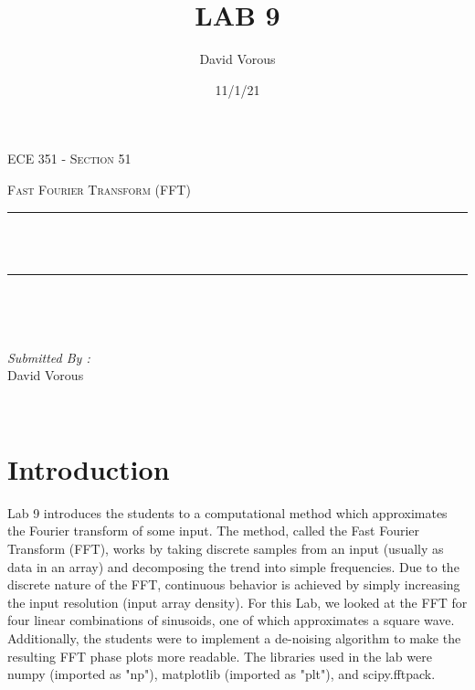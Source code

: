 \documentclass[12pt]{report}
\title{LAB 9}
\author{ David Vorous}
\date{11/1/21}
\makeatletter
\let\thetitle\@title
\makeatother
\begin{document}
\begin{titlepage}
	\centering
    \vspace*{0.5 cm}
\begin{center}    \textsc{\Large   ECE 351 - Section 51 }\\[2.0 cm]	\end{center}
	\textsc{\Large Fast Fourier Transform (FFT) }\\[0.5 cm]
	\rule{\linewidth}{0.2 mm} \\[0.4 cm]
	{ \huge \bfseries \thetitle}\\
	\rule{\linewidth}{0.2 mm} \\[1.5 cm]
	
	\begin{minipage}{0.4\textwidth}
		\begin{flushleft} \large
			\end{flushleft}
			\end{minipage}~
			\begin{minipage}{0.4\textwidth}
            
			\begin{flushright} \large
			\emph{Submitted By :} \\
			David Vorous  
		\end{flushright}
           
	\end{minipage}\\[2 cm]

\end{titlepage}


\tableofcontents

\pagebreak

\renewcommand{\thesection}{\arabic{section}}

\section{Introduction}

Lab 9 introduces the students to a computational method which approximates the Fourier transform of some input. The method, called the Fast Fourier Transform (FFT), works by taking discrete samples from an input (usually as data in an array) and decomposing the trend into simple frequencies. Due to the discrete nature of the FFT, continuous behavior is achieved by simply increasing the input resolution (input array density). For this Lab, we looked at the FFT for four linear combinations of sinusoids, one of which approximates a square wave. Additionally, the students were to implement a de-noising algorithm to make the resulting FFT phase plots more readable. The libraries used in the lab were numpy (imported as "np"), matplotlib (imported as "plt"), and scipy.fftpack.
\end{document}

